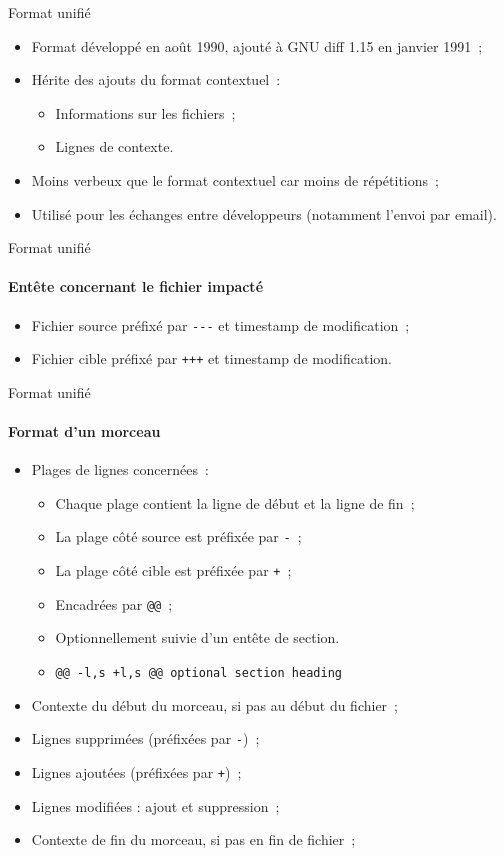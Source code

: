 \begin{frame}[fragile]{Format unifié}
\begin{itemize}[<+->]
 \item Format développé en août 1990, ajouté à GNU diff 1.15 en janvier 1991~;
 \item Hérite des ajouts du format contextuel~:
 \begin{itemize}[<+->]
  \item Informations sur les fichiers~;
  \item Lignes de contexte.
 \end{itemize}
 \item Moins verbeux que le format contextuel car moins de répétitions~;
 \item Utilisé pour les échanges entre développeurs (notamment l'envoi par email).
\end{itemize}
\end{frame}

\begin{frame}[fragile]{Format unifié}
 \framesubtitle{Entête concernant le fichier impacté}
 \begin{itemize}[<+->]
  \item Fichier source préfixé par \verb|---| et timestamp de modification~;
  \item Fichier cible préfixé par \verb|+++| et timestamp de modification.
 \end{itemize}
\end{frame}

\begin{frame}[fragile]{Format unifié}
\framesubtitle{Format d'un morceau}
\begin{itemize}[<+->]
 \item Plages de lignes concernées~:
 \begin{itemize}[<+->]
   \item Chaque plage contient la ligne de début et la ligne de fin~;
   \item La plage côté source est préfixée par \verb|-|~;
   \item La plage côté cible est préfixée par \verb|+|~;
   \item Encadrées par \verb|@@|~;
   \item Optionnellement suivie d'un entête de section.
   \item \verb|@@ -l,s +l,s @@ optional section heading|
  \end{itemize}
  \item Contexte du début du morceau, si pas au début du fichier~;
  \item Lignes supprimées (préfixées par \verb|-|)~;
  \item Lignes ajoutées (préfixées par \verb|+|)~;
  \item Lignes modifiées : ajout et suppression~;
  \item Contexte de fin du morceau, si pas en fin de fichier~;
\end{itemize}
\end{frame}


